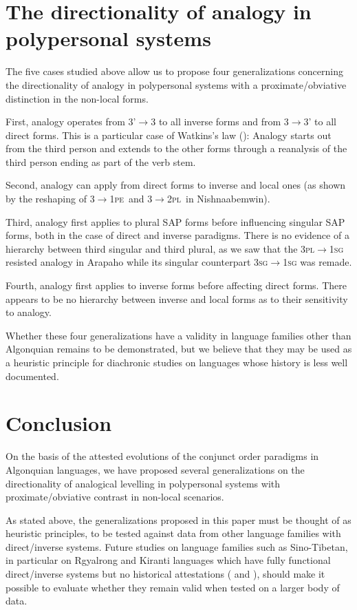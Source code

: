 \documentclass[twoside,a4paper,11pt]{article}
\newcommand{\sg}{\textsc{sg}}
\newcommand{\pl}{\textsc{pl}}
\newcommand{\Σ}{\greek{Σ}}
\newcommand{\pe}{\textsc{pe}}
\begin{document}
\section{The directionality of analogy in polypersonal systems}

The five cases studied above allow us to propose four generalizations concerning the directionality of analogy in polypersonal systems with a proximate/obviative distinction in the non-local forms.
 
First, analogy operates from 3'$\rightarrow$3 to all inverse forms and from 3$\rightarrow$3' to all direct forms. This is a particular case of   Watkins's law (\citealt{watkins62celtic}): Analogy starts out from the third person and extends to the other forms through a reanalysis of the third person ending as part of the verb stem.
 
Second, analogy can apply from direct forms to inverse and  local ones (as shown by the reshaping of 3$\rightarrow$1\pe\ and 3$\rightarrow$2\pl\ in Nishnaabemwin).

Third,  analogy first applies to plural SAP forms before influencing singular SAP forms, both in the case of direct and inverse paradigms. There is no evidence of a hierarchy between third singular and third plural, as we saw that the 3\pl{}$\rightarrow$1\sg{} resisted analogy in Arapaho while its singular counterpart 3\sg{}$\rightarrow$1\sg{} was remade.

Fourth, analogy first applies   to inverse forms before affecting direct forms. There appears  to be no hierarchy between inverse and local forms as to their sensitivity to analogy.

Whether these four generalizations have a validity in language families other than Algonquian remains to be demonstrated, but we believe that they may be used as a heuristic principle for diachronic studies on languages whose history is less well documented.  

\section{Conclusion}

On the basis of the attested evolutions of the conjunct order paradigms in Algonquian languages, we have proposed several generalizations on the directionality of analogical levelling in polypersonal systems with proximate/obviative contrast in non-local scenarios. 

As stated above, the generalizations proposed in this paper must be thought of as heuristic principles, to be tested against data from other language families with direct/inverse systems. Future studies on language families such as Sino-Tibetan, in particular on Rgyalrong and Kiranti languages which have fully functional direct/inverse systems but no historical attestations (\citealp{delancey81direction, jacques10inverse, jackson02rentongdengdi} and \citealp{gongxun14agreement}), should make it possible to evaluate whether they remain valid when tested on a larger body of data.
\end{document}
